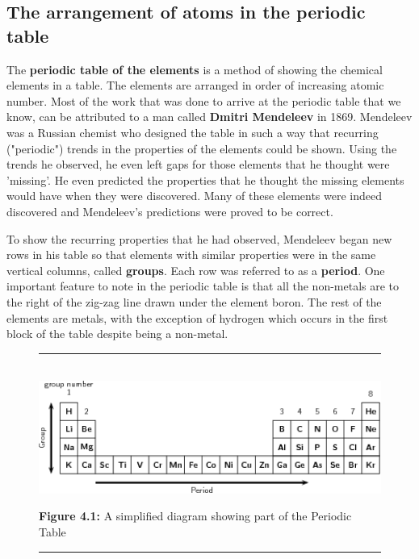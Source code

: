             \subsection{ The arrangement of atoms in the periodic table}
            \nopagebreak
      \label{m38760*id261491}The \textbf{periodic table of the elements} is a method of showing the chemical elements in a table. The elements are arranged in order of increasing atomic number. Most of the work that was done to arrive at the periodic table that we know, can be attributed to a man called \textbf{Dmitri Mendeleev} in 1869. Mendeleev was a Russian chemist who designed the table in such a way that recurring ("periodic") trends in the properties of the elements could be shown. Using the trends he observed, he even left gaps for those elements that he thought were 'missing'. He even predicted the properties that he thought the missing elements would have when they were discovered. Many of these elements were indeed discovered and Mendeleev's predictions were proved to be correct.\par 
      \label{m38760*id261511}To show the recurring properties that he had observed, Mendeleev began new rows in his table so that elements with similar properties were in the same vertical columns, called \textbf{groups}. Each row was referred to as a \textbf{period}. One important feature to note in the periodic table is that all the non-metals are to the right of the zig-zag line drawn under the element boron. The rest of the elements are metals, with the exception of hydrogen which occurs in the first block of the table despite being a non-metal.\par 
    \setcounter{subfigure}{0}
	\begin{figure}[H] %
    \begin{center}
    \rule[.1in]{\figurerulewidth}{.005in} \\
        \label{m38760*uid133!!!underscore!!!media}\label{m38760*uid133!!!underscore!!!printimage}\includegraphics[width=14cm]{col11305.imgs/m38760_CG10C3_014.png} %
      \vspace{2pt}
    \vspace{\rubberspace}\par \begin{cnxcaption}
	  \small \textbf{Figure 4.1: }A simplified diagram showing part of the Periodic Table
	\end{cnxcaption}
    \vspace{.1in}
    \rule[.1in]{\figurerulewidth}{.005in} \\
    \end{center}
 \end{figure}       
